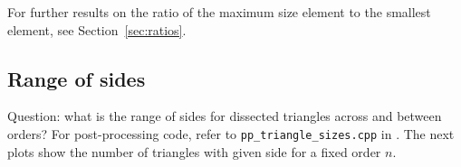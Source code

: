 \documentclass[12pt,amstags,fleqn]{article}
\theoremstyle{plain}
\theoremstyle{definition}
\begin{document}
For further results on the ratio of the maximum size element to the smallest element, see Section~\ref{sec:ratios}.

\subsection{Range of sides}
\label{sec:range-of-sides}

Question: what is the range of sides for dissected triangles across and
between orders? For post-processing code, refer to \texttt{pp\_triangle\_sizes.cpp} in \cite{githubrepo}.
The next plots show the number of triangles with given side for a fixed order $n$.

\begin{center}
\end{center}

\begin{center}
\end{center}

\begin{center}
\end{center}

\begin{center}
\end{center}

\begin{center}
\end{center}

\begin{center}
\end{center}

\begin{center}
\end{center}

\begin{center}
\end{center}

\begin{center}
\end{center}
\end{document}
